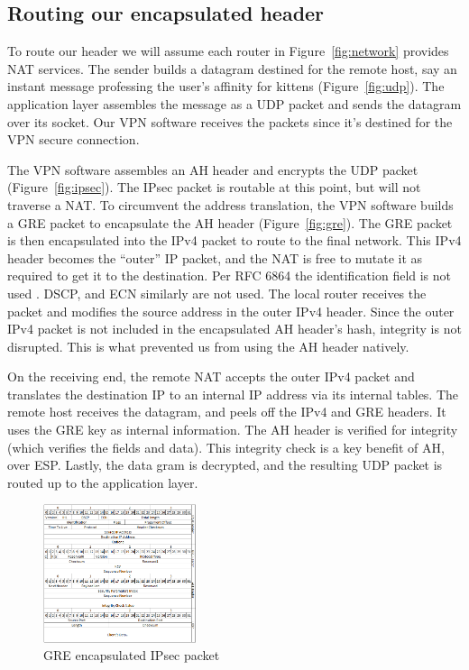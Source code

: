 \documentclass[conference,12pt]{IEEEtran}
\begin{document}
\subsection{Routing our encapsulated header}
To route our header we will assume each router in Figure~\ref{fig:network}
provides NAT services.  The sender builds a datagram destined for the remote
host, say an
instant message professing the user's affinity for kittens
(Figure~\ref{fig:udp}). The application layer assembles the message as a UDP
packet and sends the datagram over its socket. Our VPN software receives the packets
since it's destined for the VPN secure connection.  

The VPN software assembles an AH header and encrypts the UDP packet (Figure~\ref{fig:ipsec}).  The IPsec
packet is routable at this point, but will not traverse a NAT.  To circumvent
the address translation, the VPN software builds a GRE packet to encapsulate the
AH header (Figure~\ref{fig:gre}).  The GRE packet is then encapsulated into the
IPv4 packet to route to the final network. This IPv4 header becomes the
``outer'' IP packet, and the NAT is free to mutate it as required to get it to the
destination. Per RFC 6864 the identification field is not used
\autocite{rfc6864}. DSCP, and ECN
similarly are not used. The local router receives the packet and modifies the source address
 in the outer IPv4 header. Since the outer IPv4 packet is not included in the
 encapsulated AH header's hash, integrity is not disrupted. This is what prevented us from using the AH
header natively. 

On the receiving end, the remote NAT accepts the outer IPv4 packet and
translates the destination IP to an internal IP address via its internal
tables.  The remote host receives the datagram, and peels off the IPv4 and
GRE headers. It uses the GRE key as internal information.  The AH header is
verified for integrity (which verifies the fields and data).  This integrity
check is a key benefit of AH, over ESP. Lastly, the data gram is
decrypted, and the resulting UDP packet is routed up to the application layer.


\begin{figure}
\centering
\includegraphics[width=0.4\textwidth]{packet.png}
\caption{GRE encapsulated IPsec packet}
\label{fig:packet_structure}
\end{figure}
\end{document}
